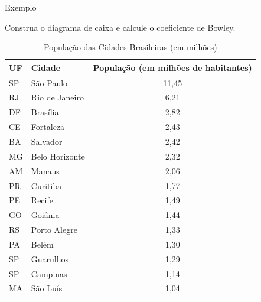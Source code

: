 \documentclass[8pt]{beamer}
\begin{document}
% 
% 
 \begin{frame}{Exemplo}

Construa o diagrama de caixa e calcule o coeficiente de Bowley.
  
  {\small
\begin{table}[h]
	\centering
	\caption{População das Cidades Brasileiras (em milhões)}
	\begin{tabular}{l|lc}
		\toprule
		\textbf{UF} & \textbf{Cidade} & {\textbf{População (em milhões de habitantes)}} \\
		\midrule
		SP & São Paulo      & 11,45 \\
		RJ & Rio de Janeiro  & 6,21  \\
		DF & Brasília        & 2,82  \\
		CE & Fortaleza       & 2,43  \\
		BA & Salvador        & 2,42  \\
		MG & Belo Horizonte  & 2,32  \\
		AM & Manaus          & 2,06  \\
		PR & Curitiba        & 1,77  \\
		PE & Recife          & 1,49  \\
		GO & Goiânia         & 1,44  \\
		RS & Porto Alegre    & 1,33  \\
		PA & Belém           & 1,30  \\
		SP & Guarulhos       & 1,29  \\
		SP & Campinas        & 1,14  \\
		MA & São Luís        & 1,04  \\
		\bottomrule
	\end{tabular}
\end{table}
  }
 \end{frame}
 
\end{document}
